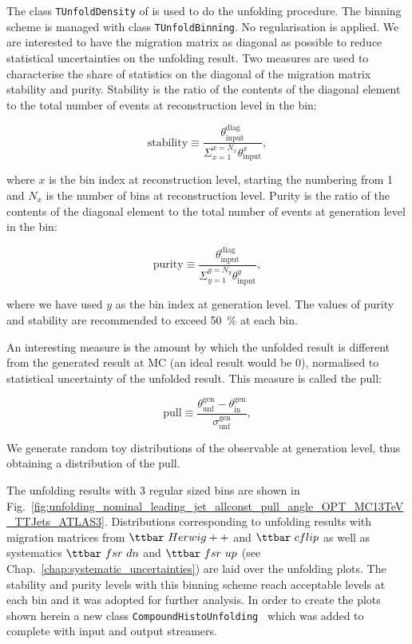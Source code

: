 The class \lstinline[language=sh]|TUnfoldDensity|\cite{Schmitt:2012kp} of \ROOT is used to do the unfolding procedure. The binning scheme is managed with class \lstinline[language=sh]|TUnfoldBinning|. No regularisation is applied. We are interested to have the migration matrix as diagonal as possible to reduce statistical uncertainties on the unfolding result. Two measures are used to characterise the share of statistics on the diagonal of the migration matrix \textendash stability and purity. Stability is the ratio of the contents of the diagonal element to the total number of events at reconstruction level in the bin:

\begin{equation}
  \text{stability}\equiv\frac{\theta^{\text{diag}}_{\text{input}}}{\Sigma_{x=1}^{x=N_{x}}\theta^{x}_{\text{input}}},
\end{equation}

\noindent where $x$ is the bin index at reconstruction level, starting the numbering from 1 and $N_{x}$ is the number of bins at reconstruction level. Purity is the ratio of the contents of the diagonal element to the total number of events at generation level in the bin:

\begin{equation}
  \text{purity}\equiv\frac{\theta^{\text{diag}}_{\text{input}}}{\Sigma_{y=1}^{y=N_{y}}\theta^{y}_{\text{input}}},
\end{equation}

\noindent where we have used $y$ as the bin index at generation level. The values of purity and stability are recommended to exceed 50~\% at each bin.

An interesting measure is the amount by which the unfolded result is different from the generated result at MC (an ideal result would be 0), normalised to statistical uncertainty of the unfolded result. This measure is called the pull:

\begin{equation}
  \text{pull}\equiv\frac{\theta^{\text{gen}}_{\text{unf}}-\theta^{\text{gen}}_{\text{in}}}{\sigma^{\text{gen}}_{\text{unf}}},
\end{equation}

We generate random toy distributions of the observable at generation level, thus obtaining a distribution of the pull.

The unfolding results with 3 regular sized bins are shown in Fig.~\ref{fig:unfolding_nominal_leading_jet_allconst_pull_angle_OPT_MC13TeV_TTJets_ATLAS3}. Distributions corresponding to unfolding results with migration matrices from $\ttbar\ Herwig++$ and $\ttbar\ cflip$ as well as systematics $\ttbar\ fsr\ dn$ and $\ttbar\ fsr\ up$ (see Chap.~\ref{chap:systematic_uncertainties}) are laid over the unfolding plots. The stability and purity levels with this binning scheme reach acceptable levels at each bin and it was adopted for further analysis. In order to create the plots shown herein a new class \lstinline[language=sh]|CompoundHistoUnfolding|~\cite{url:compoundhistounfolding} which was added to \ROOT complete with input and output streamers.

